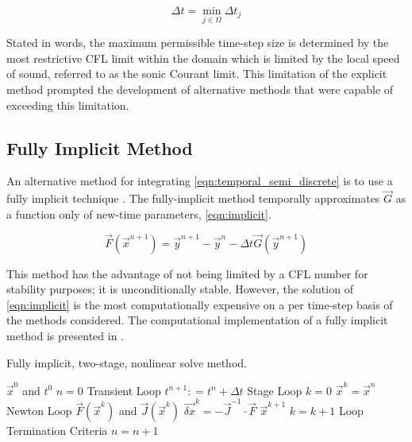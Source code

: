 \begin{equation}
\label{eqn:global_cfl}
\Delta t = \min_{j \in \Omega} \Delta t_j
\end{equation}

Stated in words, the maximum permissible time-step size is determined by the most restrictive CFL limit within the domain which is limited by the local speed of sound, referred to as the sonic Courant limit.
This limitation of the explicit method prompted the development of alternative methods that were capable of exceeding this limitation.

\subsection{Fully Implicit Method}
\label{subsect:numerics_fully_implicit}
An alternative method for integrating \eqref{eqn:temporal_semi_discrete} is to use a fully implicit technique \cite{Frepoli2003, Barre1990}.
The fully-implicit method temporally approximates $\vec{G}$ as a function only of new-time parameters, \eqref{eqn:implicit}.

\begin{equation}
\label{eqn:implicit}
\vec{F}(\vec{x}^{n+1}) = \vec{y}^{n+1} - \vec{y}^{n} - \Delta t \vec{G}(\vec{y}^{n+1})
\end{equation}

This method has the advantage of not being limited by a CFL number for stability purposes; it is unconditionally stable.
However, the solution of \eqref{eqn:implicit} is the most computationally expensive on a per time-step basis of the methods considered.
The computational implementation of a fully implicit method is presented in .

\begin{algo}[H]
\caption{Fully implicit, two-stage, nonlinear solve method.}
\label{algo:implicit}
\setlength{\baselineskip}{0.625\baselineskip}
\begin{algorithmic}[1]
\Require $\vec{x}^{0}$ and $t^{0}$
\Set $n = 0$
\Loop \; Transient Loop
    \State $t^{n+1} : = t^{n} + \Delta t$
     \; Stage Loop
    \State $k = 0$
    \State $\vec{x}^{k} = \vec{x}^{n}$
    \Loop \; Newton Loop
		\Calculate $\vec{F}(\vec{x}^{k})$ and $\vec{J}(\vec{x}^{k})$
		\Calculate $\vec{\delta x}^k = - \vec{J}^{-1}\cdot\vec{F}$
		\BlackBox $\vec{x}^{k+1}$
		\State $k = k + 1$
		\BlackBox Loop Termination Criteria
	\EndLoop	
	\EndFor
	\State $n = n + 1$
\EndLoop
\end{algorithmic}
\end{algo}

